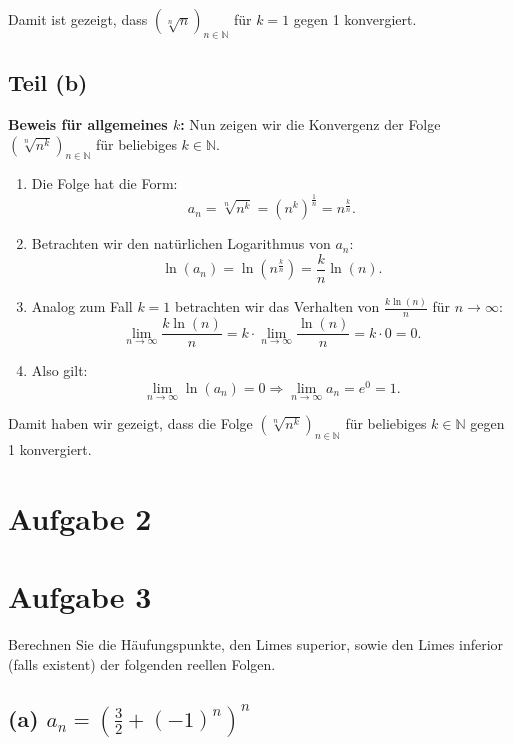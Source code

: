 \documentclass[11pt]{article}
\begin{document}
Damit ist gezeigt, dass \( \left( \sqrt[n]{n} \right)_{n \in \mathbb{N}} \) für \( k = 1 \) gegen 1 konvergiert.

\subsection*{Teil (b)}

\textbf{Beweis für allgemeines \( k \):} Nun zeigen wir die Konvergenz der Folge \( \left( \sqrt[n]{n^k} \right)_{n \in \mathbb{N}} \) für beliebiges \( k \in \mathbb{N} \).

\begin{enumerate}
    \item Die Folge hat die Form:
    \[
    a_n = \sqrt[n]{n^k} = (n^k)^{\frac{1}{n}} = n^{\frac{k}{n}}.
    \]

    \item Betrachten wir den natürlichen Logarithmus von \( a_n \):
    \[
    \ln(a_n) = \ln\left(n^{\frac{k}{n}}\right) = \frac{k}{n} \ln(n).
    \]

    \item Analog zum Fall \( k = 1 \) betrachten wir das Verhalten von \( \frac{k \ln(n)}{n} \) für \( n \to \infty \):
    \[
    \lim_{n \to \infty} \frac{k \ln(n)}{n} = k \cdot \lim_{n \to \infty} \frac{\ln(n)}{n} = k \cdot 0 = 0.
    \]

    \item Also gilt:
    \[
    \lim_{n \to \infty} \ln(a_n) = 0 \Rightarrow \lim_{n \to \infty} a_n = e^0 = 1.
    \]
\end{enumerate}

Damit haben wir gezeigt, dass die Folge \( \left( \sqrt[n]{n^k} \right)_{n \in \mathbb{N}} \) für beliebiges \( k \in \mathbb{N} \) gegen 1 konvergiert.

\section*{Aufgabe 2}

\section*{Aufgabe 3}

Berechnen Sie die Häufungspunkte, den Limes superior, sowie den Limes inferior (falls existent) der folgenden reellen Folgen.

\subsection*{(a) \( a_n = \left( \frac{3}{2} + (-1)^n \right)^n \)}
\end{document}
